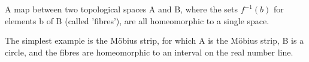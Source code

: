 A map between two topological spaces A and B, where the sets $f^{-1}(b)$ 
for elements b of B (called 'fibres'), are all homeomorphic to a single space.
\par
The simplest example is the M\"obius strip, for which 
A is the M\"obius strip, B is a circle, and the fibres are homeomorphic
to an interval on the real number line.